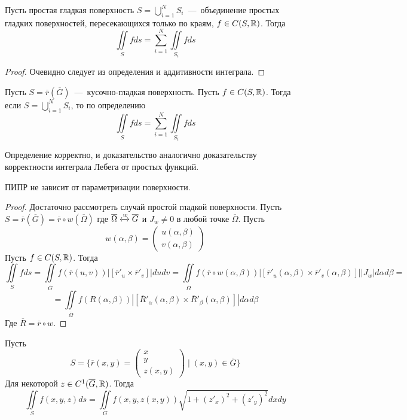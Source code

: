 \begin{lemma}
    Пусть простая гладкая поверхность $S = \bigcup\limits_{i = 1}^N S_i$~---~объединение простых гладких поверхностей, пересекающихся только по краям, $f \in C(S, \mathbb{R})$. Тогда \[\iint\limits_S fds = \sum\limits_{i = 1}^N \iint\limits_{S_i} fds\]
\end{lemma}
\begin{proof}
    Очевидно следует из определения и аддитивности интеграла.
\end{proof}
\begin{definition}
    Пусть $S = \overline{r}(\overline{G})$~---~кусочно-гладкая поверхность. Пусть $f \in C(S, \mathbb{R})$. Тогда если $S = \bigcup\limits_{i = 1}^N S_i$, то по определению \[\iint\limits_S fds = \sum\limits_{i = 1}^N \iint\limits_{S_i} fds\]
\end{definition}
\begin{fact}
    Определение корректно, и доказательство аналогично доказательству корректности интеграла Лебега от простых функций.
\end{fact}
\begin{theorem}
    ПИПР не зависит от параметризации поверхности.
\end{theorem}
\begin{proof}
    Достаточно рассмотреть случай простой гладкой поверхности. Пусть $S = \overline{r}(\overline{G}) = \overline{r} \circ w(\overline{\Omega})$ где $\overline{\Omega} \xleftrightarrow{w} \overline{G}$ и $J_w \neq 0$ в любой точке $\overline{\Omega}$. Пусть \begin{equation*}
        w(\alpha, \beta) = \begin{pmatrix}
            u(\alpha, \beta) \\ v(\alpha, \beta)
        \end{pmatrix}
    \end{equation*}
    Пусть $f \in C(S, \mathbb{R})$. Тогда \[\iint\limits_S fds = \iint\limits_{\overline{G}} f(\overline{r}(u, v))|[\overline{r}'_u \times \overline{r}'_v]|dudv = \iint\limits_{\overline{\Omega}} f(\overline{r}\circ w(\alpha, \beta))|[\overline{r}'_u(\alpha, \beta) \times \overline{r}'_v(\alpha, \beta)]||J_w|d\alpha d\beta = \]\[ = \iint\limits_{\overline{\Omega}} f(R(\alpha, \beta))|[\overline{R}'_\alpha(\alpha, \beta) \times \overline{R}'_\beta(\alpha, \beta)]|d\alpha d\beta\] 
    Где $\overline{R} = \overline{r} \circ w$.
\end{proof}
\begin{lemma}
    Пусть \[S = \{\overline{r}(x, y) = \begin{pmatrix}
        x \\ y \\ z(x, y)
    \end{pmatrix} \mid (x, y) \in \overline{G} \}\]
    Для некоторой $z \in C^1(\overline{G}, \mathbb{R})$. Тогда \[\iint\limits_S f(x, y, z)ds = \iint\limits_G f(x, y, z(x, y))\sqrt{1 + (z'_x)^2 + (z'_y)^2}dxdy\]
\end{lemma}
